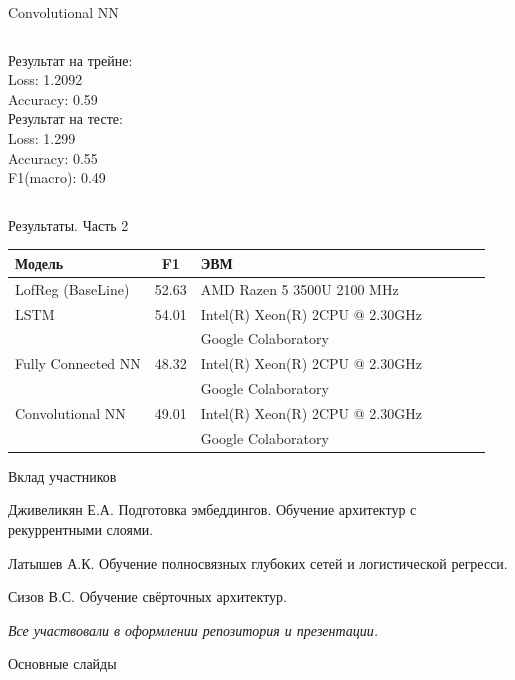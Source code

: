 \documentclass[c, aspectratio = 43]{beamer}
\begin{document}
\begin{frame}{Convolutional NN}
\begin{columns}
\begin{column}{0.5\textwidth}
                Результат на трейне:\\
                Loss: 1.2092\\
                Accuracy: 0.59\\

                Результат на тесте:\\
                Loss: 1.299\\
                Accuracy: 0.55\\
                F1(macro): 0.49\\
            \end{column}

        \end{columns}


    \end{frame}
  \begin{frame}{Результаты. Часть 2}


\begin{table}[]
\begin{tabular}{lclclcl}
\hline
 Модель & F1 & ЭВМ \\
 \hline
 LofReg (BaseLine) & 52.63 & AMD Razen 5 3500U 2100 MHz\\
\hline
LSTM & 54.01 & Intel(R) Xeon(R) 2CPU @ 2.30GHz \\ 
&&Google Colaboratory\\
\hline
 Fully Connected NN & 48.32 & Intel(R) Xeon(R) 2CPU @ 2.30GHz  \\ 
&&Google Colaboratory\\
\hline
Convolutional NN & 49.01 & Intel(R) Xeon(R) 2CPU @ 2.30GHz  \\ 
&&Google Colaboratory\\
\hline
\end{tabular}
\end{table}

\end{frame}



\begin{frame}{Вклад участников}
	
	\begin{block}{Дживеликян Е.А.}
		Подготовка эмбеддингов. Обучение архитектур с рекуррентными слоями.
	\end{block}
	
	\begin{block}{Латышев А.К.}
		Обучение полносвязных глубоких сетей и логистической регресси.
	\end{block}
	
	\begin{block}{Сизов В.С.}
		Обучение свёрточных архитектур. 
	\end{block}

	\vfill
	\textit{Все участвовали в оформлении репозитория и презентации.}

\end{frame}



\beamertemplatenavigationsymbolsempty
\begin{frame}[noframenumbering]{Основные слайды}
	\hypertarget{toc}{}
	\tableofcontents[part=1]
\end{frame}
\end{document}
